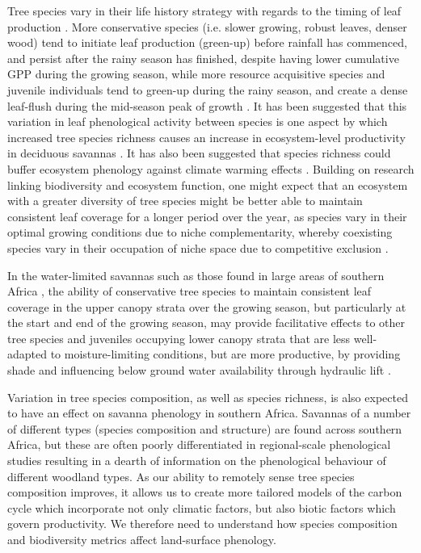 \documentclass[11pt,a4paper]{article}
\begin{document}
Tree species vary in their life history strategy with regards to the timing of leaf production \citep{Fenner1998, Cole2017, Medina1994}. More conservative species (i.e. slower growing, robust leaves, denser wood) tend to initiate leaf production (green-up) before rainfall has commenced, and persist after the rainy season has finished, despite having lower cumulative GPP during the growing season, while more resource acquisitive species and juvenile individuals tend to green-up during the rainy season, and create a dense leaf-flush during the mid-season peak of growth \citep{}. It has been suggested that this variation in leaf phenological activity between species is one aspect by which increased tree species richness causes an increase in ecosystem-level productivity in deciduous savannas \citep{}. It has also been suggested that species richness could buffer ecosystem phenology against climate warming effects \citep{Parmesan2007}. Building on research linking biodiversity and ecosystem function, one might expect that an ecosystem with a greater diversity of tree species might be better able to maintain consistent leaf coverage for a longer period over the year, as species vary in their optimal growing conditions due to niche complementarity, whereby coexisting species vary in their occupation of niche space due to competitive exclusion \citep{}.

In the water-limited savannas such as those found in large areas of southern Africa \citep{}, the ability of conservative tree species to maintain consistent leaf coverage in the upper canopy strata over the growing season, but particularly at the start and end of the growing season, may provide facilitative effects to other tree species and juveniles occupying lower canopy strata that are less well-adapted to moisture-limiting conditions, but are more productive, by providing shade and influencing below ground water availability through hydraulic lift \citep{}. 

Variation in tree species composition, as well as species richness, is also expected to have an effect on savanna phenology in southern Africa. Savannas of a number of different types (species composition and structure) are found across southern Africa, but these are often poorly differentiated in regional-scale phenological studies \citep{} resulting in a dearth of information on the phenological behaviour of different woodland types. As our ability to remotely sense tree species composition improves, it allows us to create more tailored models of the carbon cycle which incorporate not only climatic factors, but also biotic factors which govern productivity. We therefore need to understand how species composition and biodiversity metrics affect land-surface phenology. 
\end{document}
